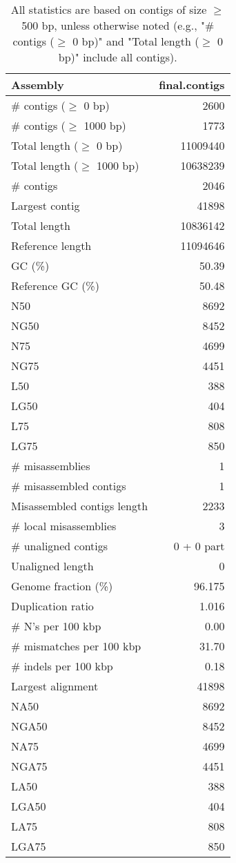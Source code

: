 \documentclass[12pt,a4paper]{article}
\begin{document}
\begin{table}[ht]
\begin{center}
\caption{All statistics are based on contigs of size $\geq$ 500 bp, unless otherwise noted (e.g., "\# contigs ($\geq$ 0 bp)" and "Total length ($\geq$ 0 bp)" include all contigs).}
\begin{tabular}{|l*{1}{|r}|}
\hline
Assembly & final.contigs \\ \hline
\# contigs ($\geq$ 0 bp) & 2600 \\ \hline
\# contigs ($\geq$ 1000 bp) & 1773 \\ \hline
Total length ($\geq$ 0 bp) & 11009440 \\ \hline
Total length ($\geq$ 1000 bp) & 10638239 \\ \hline
\# contigs & 2046 \\ \hline
Largest contig & 41898 \\ \hline
Total length & 10836142 \\ \hline
Reference length & 11094646 \\ \hline
GC (\%) & 50.39 \\ \hline
Reference GC (\%) & 50.48 \\ \hline
N50 & 8692 \\ \hline
NG50 & 8452 \\ \hline
N75 & 4699 \\ \hline
NG75 & 4451 \\ \hline
L50 & 388 \\ \hline
LG50 & 404 \\ \hline
L75 & 808 \\ \hline
LG75 & 850 \\ \hline
\# misassemblies & 1 \\ \hline
\# misassembled contigs & 1 \\ \hline
Misassembled contigs length & 2233 \\ \hline
\# local misassemblies & 3 \\ \hline
\# unaligned contigs & 0 + 0 part \\ \hline
Unaligned length & 0 \\ \hline
Genome fraction (\%) & 96.175 \\ \hline
Duplication ratio & 1.016 \\ \hline
\# N's per 100 kbp & 0.00 \\ \hline
\# mismatches per 100 kbp & 31.70 \\ \hline
\# indels per 100 kbp & 0.18 \\ \hline
Largest alignment & 41898 \\ \hline
NA50 & 8692 \\ \hline
NGA50 & 8452 \\ \hline
NA75 & 4699 \\ \hline
NGA75 & 4451 \\ \hline
LA50 & 388 \\ \hline
LGA50 & 404 \\ \hline
LA75 & 808 \\ \hline
LGA75 & 850 \\ \hline
\end{tabular}
\end{center}
\end{table}
\end{document}

